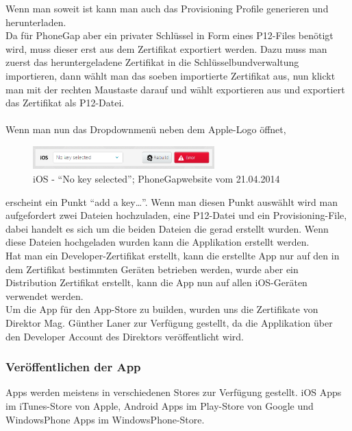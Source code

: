 Wenn man soweit ist kann man auch das Provisioning Profile generieren und herunterladen.\\
Da für PhoneGap aber ein privater Schlüssel in Form eines P12-Files benötigt wird, muss dieser erst aus dem Zertifikat exportiert werden. Dazu muss man zuerst das heruntergeladene Zertifikat in die Schlüsselbundverwaltung importieren, dann wählt man das soeben importierte Zertifikat aus, nun klickt man mit der rechten Maustaste darauf und wählt exportieren aus und exportiert das Zertifikat als P12-Datei.\\
\\
Wenn man nun das Dropdownmenü neben dem Apple-Logo öffnet,

\begin{figure}[H]
\centering
\includegraphics[keepaspectratio=true, width=7cm]{images/phoneGap/PhoneGap4.png}
\caption{iOS - \enquote{No key selected}; PhoneGapwebsite vom 21.04.2014}
\end{figure}

erscheint ein Punkt \enquote{add a key…}. Wenn man diesen Punkt auswählt wird man aufgefordert zwei Dateien hochzuladen, eine P12-Datei und ein Provisioning-File, dabei handelt es sich um die beiden Dateien die gerad erstellt wurden. Wenn diese Dateien hochgeladen wurden kann die Applikation erstellt werden.\\
Hat man ein Developer-Zertifikat erstellt, kann die erstellte App nur auf den in dem Zertifikat bestimmten Geräten betrieben werden, wurde aber ein Distribution Zertifikat erstellt, kann die App nun auf allen iOS-Geräten verwendet werden.\\
Um die App für den App-Store zu builden, wurden uns die Zertifikate von Direktor Mag. Günther Laner zur Verfügung gestellt, da die Applikation über den Developer Account des Direktors veröffentlicht wird.\\



\subsubsection{Veröffentlichen der App}

Apps werden meistens in verschiedenen Stores zur Verfügung gestellt. iOS Apps im iTunes-Store von Apple, Android Apps im Play-Store von Google und WindowsPhone Apps im WindowsPhone-Store.\\
